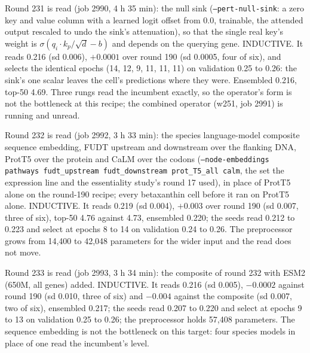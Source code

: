 Round 231 is read (job 2990, 4 h 35 min): the null sink (\texttt{--pert-null-sink}: a
zero key and value column with a learned logit offset from 0.0, trainable, the attended
output rescaled to undo the sink's attenuation), so that the single real key's weight
is $\sigma(q_i \cdot k_p / \sqrt{d} - b)$ and depends on the querying gene. INDUCTIVE.
It reads 0.216 (sd 0.006), $+0.0001$ over round 190 (sd 0.0005, four of six), and
selects the identical epochs (14, 12, 9, 11, 11, 11) on validation 0.25 to 0.26: the
sink's one scalar leaves the cell's predictions where they were. Ensembled 0.216,
top-50 4.69. Three rungs read the incumbent exactly, so the operator's form is not the
bottleneck at this recipe; the combined operator (w251, job 2991) is running and unread.

Round 232 is read (job 2992, 3 h 33 min): the species language-model composite
sequence embedding, FUDT upstream and downstream over the flanking DNA, ProtT5 over the
protein and CaLM over the codons (\texttt{--node-embeddings pathways fudt\_upstream
fudt\_downstream prot\_T5\_all calm}, the set the expression line and the essentiality
study's round 17 used), in place of ProtT5 alone on the round-190 recipe; every
betaxanthin cell before it ran on ProtT5 alone. INDUCTIVE. It reads 0.219 (sd 0.004),
$+0.003$ over round 190 (sd 0.007, three of six), top-50 4.76 against 4.73, ensembled
0.220; the seeds read 0.212 to 0.223 and select at epochs 8 to 14 on validation 0.24 to
0.26. The preprocessor grows from 14,400 to 42,048 parameters for the wider input and
the read does not move.

Round 233 is read (job 2993, 3 h 34 min): the composite of round 232 with ESM2 (650M,
all genes) added. INDUCTIVE. It reads 0.216 (sd 0.005), $-0.0002$ against round 190
(sd 0.010, three of six) and $-0.004$ against the composite (sd 0.007, two of six),
ensembled 0.217; the seeds read 0.207 to 0.220 and select at epochs 9 to 13 on
validation 0.25 to 0.26; the preprocessor holds 57,408 parameters. The sequence
embedding is not the bottleneck on this target: four species models in place of one
read the incumbent's level.

